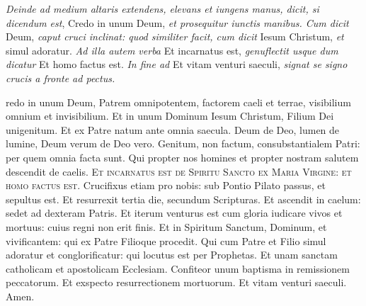 \textit{Deinde ad medium altaris extendens, elevans et iungens manus, dicit, si
dicendum est}, Credo in unum Deum, \textit{et prosequitur iunctis manibus.  Cum
dicit} Deum, \textit{caput cruci inclinat: quod similiter facit, cum dicit}
Iesum Christum, \textit{et} simul adoratur.  \textit{Ad illa autem verba} Et
incarnatus est, \textit{genuflectit usque dum dicatur} Et homo factus est.
\textit{In fine ad} Et vitam venturi saeculi, \textit{signat se signo crucis a
fronte ad pectus.}

redo in unum Deum, Patrem omnipotentem, factorem caeli et terrae,
visibilium omnium et invisibilium.  Et in unum Dominum  Iesum
Christum, Filium Dei unigenitum.  Et ex Patre natum ante omnia saecula.  Deum de
Deo, lumen de lumine, Deum verum de Deo vero.  Genitum, non factum,
consubstantialem Patri: per quem omnia facta sunt.  Qui propter nos homines et
propter nostram salutem descendit de caelis.   \textsc{Et
incarnatus est de Spiritu Sancto ex Maria Virgine: et homo factus est}.
Crucifixus etiam pro nobis: sub Pontio Pilato passus, et sepultus est.  Et
resurrexit tertia die, secundum Scripturas.  Et ascendit in caelum: sedet ad
dexteram Patris.  Et iterum venturus est cum gloria iudicare vivos et mortuus:
cuius regni non erit finis.  Et in Spiritum Sanctum, Dominum, et vivificantem:
qui ex Patre Filioque procedit.  Qui cum Patre et Filio 
simul adoratur et conglorificatur: qui locutus est per Prophetas.  Et unam
sanctam catholicam et apostolicam Ecclesiam.  Confiteor unum baptisma in
remissionem peccatorum.  Et exspecto resurrectionem mortuorum.  \cross{} Et
vitam venturi saeculi.  Amen.

